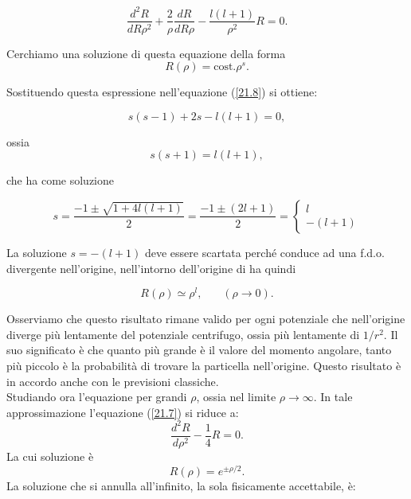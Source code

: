 \begin{equation}
\frac{d^2R}{dR\rho^2}+\frac{2}{\rho}\frac{dR}{dR\rho}-\frac{l\left(l+1\right)}{\rho^2}R=0 .
\label{21.8}
\end{equation}

Cerchiamo una soluzione di questa equazione della forma
\begin{equation}
R\left(\rho\right)=\mbox{cost.} \rho^s .
\end{equation}

Sostituendo questa espressione nell'equazione (\ref{21.8}) si ottiene:

\begin{equation}
s\left(s-1\right)+2s-l\left(l+1\right)=0 ,
\end{equation}

ossia
\begin{equation}
s\left(s+1\right)=l\left(l+1\right) ,
\end{equation}

che ha come soluzione

\begin{equation}
s=\frac{-1\pm\sqrt{1+4l\left(l+1\right)}}{2}=\frac{-1\pm\left(2l+1\right)}{2}=\begin{cases}l\\-\left(l+1\right)\end{cases}
\end{equation}

La soluzione $s=-\left(l+1\right)$ deve essere scartata perché  conduce ad una f.d.o. divergente nell'origine, nell'intorno dell'origine di ha quindi

\begin{equation}
R\left(\rho\right)\simeq\rho^l , \ \ \ \ \ \ \ \ \left(\rho\rightarrow0\right) .
\end{equation}

Osserviamo che questo risultato rimane valido per ogni potenziale che nell'origine diverge più lentamente del potenziale centrifugo, ossia più lentamente di $1/r^2$. Il suo significato è che quanto più grande è il valore del momento angolare, tanto più piccolo è la probabilità di trovare la particella nell'origine.
Questo risultato è in accordo anche con le previsioni classiche.\\
Studiando ora l'equazione per grandi $\rho$, ossia nel limite $\rho\rightarrow\infty$. In tale approssimazione l'equazione (\ref{21.7}) si riduce a:
\begin{equation}
\frac{d^2R}{d\rho^2}-\frac{1}{4}R=0 .
\end{equation}
La cui soluzione è
\begin{equation}
R\left(\rho\right)=e^{\pm\rho/2} . 
\end{equation}
La soluzione che si annulla all'infinito, la sola fisicamente accettabile, è:
 
